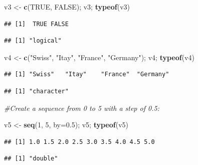 \documentclass[
]{book}
\newenvironment{Shaded}{\begin{snugshade}}{\end{snugshade}}
\newcommand{\AttributeTok}[1]{\textcolor[rgb]{0.13,0.29,0.53}{#1}}
\newcommand{\CommentTok}[1]{\textcolor[rgb]{0.56,0.35,0.01}{\textit{#1}}}
\newcommand{\ConstantTok}[1]{\textcolor[rgb]{0.56,0.35,0.01}{#1}}
\newcommand{\DecValTok}[1]{\textcolor[rgb]{0.00,0.00,0.81}{#1}}
\newcommand{\FloatTok}[1]{\textcolor[rgb]{0.00,0.00,0.81}{#1}}
\newcommand{\FunctionTok}[1]{\textcolor[rgb]{0.13,0.29,0.53}{\textbf{#1}}}
\newcommand{\NormalTok}[1]{#1}
\newcommand{\OtherTok}[1]{\textcolor[rgb]{0.56,0.35,0.01}{#1}}
\newcommand{\StringTok}[1]{\textcolor[rgb]{0.31,0.60,0.02}{#1}}
\begin{document}
\begin{Shaded}
\begin{Highlighting}[]
\NormalTok{v3 }\OtherTok{\textless{}{-}} \FunctionTok{c}\NormalTok{(}\ConstantTok{TRUE}\NormalTok{, }\ConstantTok{FALSE}\NormalTok{); v3; }\FunctionTok{typeof}\NormalTok{(v3)}
\end{Highlighting}
\end{Shaded}

\begin{verbatim}
## [1]  TRUE FALSE
\end{verbatim}

\begin{verbatim}
## [1] "logical"
\end{verbatim}

\begin{Shaded}
\begin{Highlighting}[]
\NormalTok{v4 }\OtherTok{\textless{}{-}} \FunctionTok{c}\NormalTok{(}\StringTok{"Swiss"}\NormalTok{, }\StringTok{"Itay"}\NormalTok{, }\StringTok{"France"}\NormalTok{, }\StringTok{"Germany"}\NormalTok{); v4; }\FunctionTok{typeof}\NormalTok{(v4)}
\end{Highlighting}
\end{Shaded}

\begin{verbatim}
## [1] "Swiss"   "Itay"    "France"  "Germany"
\end{verbatim}

\begin{verbatim}
## [1] "character"
\end{verbatim}

\begin{Shaded}
\begin{Highlighting}[]
\CommentTok{\#Create a sequence from 0 to 5 with a step of 0.5:}

\NormalTok{v5 }\OtherTok{\textless{}{-}} \FunctionTok{seq}\NormalTok{(}\DecValTok{1}\NormalTok{, }\DecValTok{5}\NormalTok{, }\AttributeTok{by=}\FloatTok{0.5}\NormalTok{); v5; }\FunctionTok{typeof}\NormalTok{(v5)}
\end{Highlighting}
\end{Shaded}

\begin{verbatim}
## [1] 1.0 1.5 2.0 2.5 3.0 3.5 4.0 4.5 5.0
\end{verbatim}

\begin{verbatim}
## [1] "double"
\end{verbatim}
\end{document}
